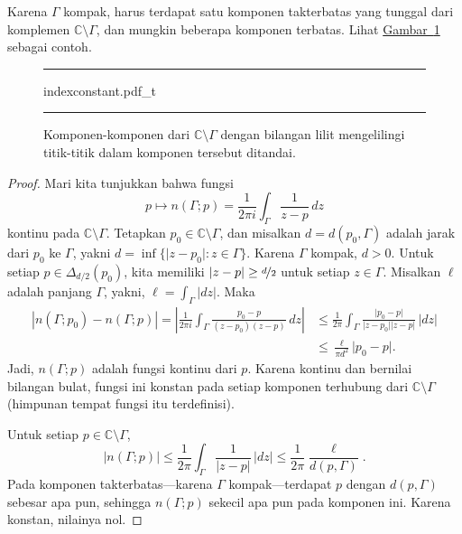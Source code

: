\documentclass[12pt,openany]{book}
\newcommand{\sabs}[1]{\lvert {#1} \rvert}
\newcommand{\abs}[1]{\left\lvert {#1} \right\rvert}
\newcommand{\C}{{\mathbb{C}}}
\theoremstyle{plain}
\theoremstyle{remark}
\theoremstyle{definition}
\newenvironment{myfig}{%
\begin{figure}[h!t]
\noindent\rule{\textwidth}{0.5pt}\vspace{12pt}\par\centering}%
{\par\noindent\rule{\textwidth}{0.5pt}
\end{figure}}
\theoremstyle{exercise}
\theoremstyle{example}
\newcommand{\figureref}[1]{\hyperref[#1]{Gambar~\ref*{#1}}}
\begin{document}
Karena $\Gamma$ kompak, harus terdapat satu komponen takterbatas yang tunggal
dari komplemen $\C \setminus \Gamma$, dan mungkin beberapa komponen
terbatas.
Lihat \figureref{fig:indexconstant} sebagai contoh.

\begin{myfig}
{indexconstant.pdf_t}
\caption{Komponen-komponen dari $\C \setminus \Gamma$ dengan 
bilangan lilit mengelilingi titik-titik dalam komponen tersebut
ditandai.\label{fig:indexconstant}}
\end{myfig}

\begin{proof}
Mari kita tunjukkan bahwa fungsi
\begin{equation*}
p \mapsto n(\Gamma;p) = \frac{1}{2\pi i} \int_\Gamma \frac{1}{z-p} \, dz
\end{equation*}
kontinu pada $\C \setminus \Gamma$.
Tetapkan $p_0 \in \C \setminus \Gamma$, dan misalkan
%
$d = d(p_0,\Gamma)$ adalah
jarak dari 
$p_0$ ke $\Gamma$, yakni
$d = \inf \bigl\{ \sabs{z-p_0} : z \in \Gamma \bigr\}$.
Karena $\Gamma$ kompak, $d > 0$.  
Untuk setiap $p \in \Delta_{d/2}(p_0)$, kita memiliki $\sabs{z-p} \geq
\nicefrac{d}{2}$ untuk setiap $z \in \Gamma$.  Misalkan $\ell$ adalah panjang
$\Gamma$, yakni, $\ell = \int_\Gamma \sabs{dz}$.  Maka
\begin{equation*}
\begin{split}
\abs{n(\Gamma;p_0)-n(\Gamma;p)}
=
\abs{\frac{1}{2\pi i} \int_\Gamma \frac{p_0-p}{(z-p_0)(z-p)} \, dz}
& \leq
\frac{1}{2\pi} \int_\Gamma \frac{\sabs{p_0-p}}{\sabs{z-p_0}\sabs{z-p}} \, \sabs{dz}
\\
& \leq 
\frac{\ell}{\pi {d}^2} \sabs{p_0-p} .
\end{split}
\end{equation*}
Jadi, $n(\Gamma;p)$ adalah fungsi kontinu dari $p$.
Karena kontinu
dan bernilai bilangan bulat, fungsi ini konstan pada setiap komponen terhubung dari
$\C \setminus \Gamma$ (himpunan tempat fungsi itu terdefinisi).

Untuk setiap $p \in \C \setminus \Gamma$,
\begin{equation*}
\sabs{n(\Gamma;p)} \leq \frac{1}{2\pi} \int_\Gamma \frac{1}{\sabs{z-p}} \,
\sabs{dz} \leq \frac{1}{2\pi} \frac{\ell}{d(p,\Gamma)} .
\end{equation*}
Pada komponen takterbatas---karena $\Gamma$ kompak---terdapat $p$
dengan $d(p,\Gamma)$ sebesar apa pun, sehingga $n(\Gamma;p)$ sekecil apa pun
pada komponen ini.  Karena konstan, nilainya nol.
\end{proof}
\end{document}
